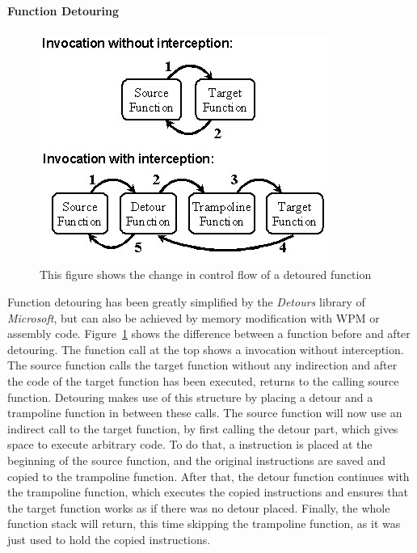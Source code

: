 \paragraph{Function Detouring}
\begin{figure}[h]
	\centering
	\includegraphics[keepaspectratio,width=.6\textwidth]{sections/background/attacks/fig_detours.png}
	\caption{This figure shows the change in control flow of a detoured function \cite{detours}}
	\label{fig:detours}
\end{figure}
Function detouring has been greatly simplified by the \emph{Detours} \cite{msdetours} library of \emph{Microsoft}, but can also be achieved by memory modification with \gls{WPM} or assembly code. Figure~\ref{fig:detours} shows the difference between a function before and after detouring. The function call at the top shows a invocation without interception. The source function calls the target function without any indirection and after the code of the target function has been executed, returns to the calling source function. Detouring makes use of this structure by placing a detour and a trampoline function in between these calls. The source function will now use an indirect call to the target function, by first calling the detour part, which gives space to execute arbitrary code. To do that, a  instruction is placed at the beginning of the source function, and the original instructions are saved and copied to the trampoline function. After that, the detour function continues with the trampoline function, which executes the copied instructions and ensures that the target function works as if there was no detour placed. Finally, the whole function stack will return, this time skipping the trampoline function, as it was just used to hold the copied instructions.